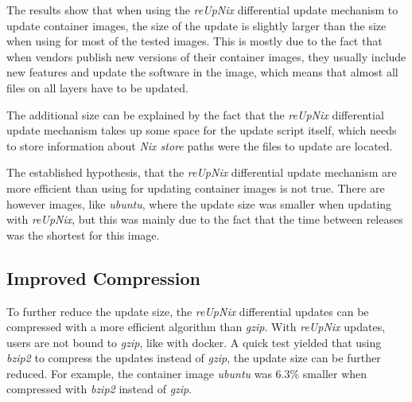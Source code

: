 \noindent
The results show that when using the \textit{reUpNix} differential update mechanism
to update container images, the size of the update is slightly larger than the size
when using  for most of the tested images. This is mostly due
to the fact that when vendors
publish new versions of their container images, they usually include new features
and update the software in the image, which means that almost all files on all
layers have to be updated.

The additional size can be explained by the fact that the \textit{reUpNix}
differential update mechanism takes up some space for the update script itself,
which needs to store information about \textit{Nix store} paths were the files
to update are located.

The established hypothesis, that the \textit{reUpNix} differential update mechanism
are more efficient than using  for updating container images
is not true. There are however images, like \textit{ubuntu}, where the update size
was smaller when updating with \textit{reUpNix}, but this was mainly due to the
fact that the time between releases was the shortest for this image.

\subsection{Improved Compression}
To further reduce the update size, the \textit{reUpNix} differential updates can
be compressed with a more efficient algorithm than \textit{gzip}. With \textit{reUpNix}
updates, users are not bound to \textit{gzip}, like with docker. A quick test
yielded that using \textit{bzip2} to compress the updates instead of \textit{gzip},
the update size can be further reduced. For example, the container image \textit{ubuntu}
was 6.3\% smaller when compressed with \textit{bzip2} instead of \textit{gzip}.

